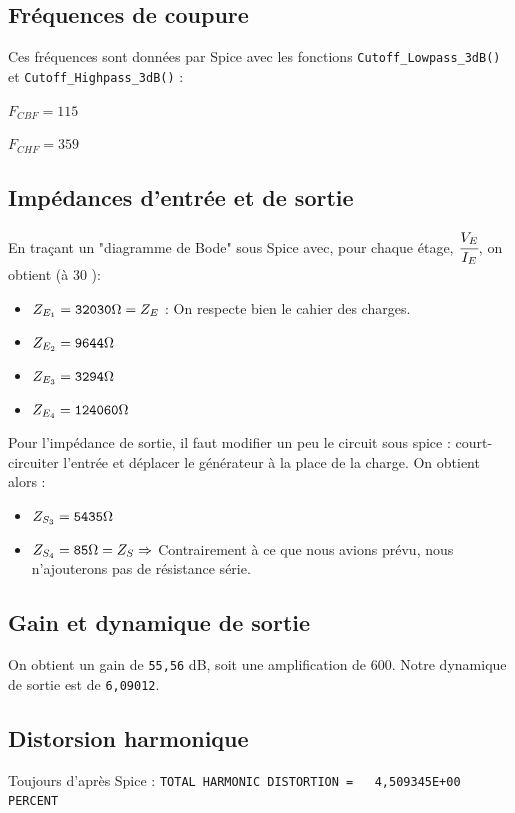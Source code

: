    \subsection{Fréquences de coupure}
    Ces fréquences sont données par Spice avec les fonctions \verb|Cutoff_Lowpass_3dB()| et \verb|Cutoff_Highpass_3dB()| :

    $F_{CBF} = 115$ \hertz

    $F_{CHF} = 359$ \kilo\hertz

   \subsection{Impédances d'entrée et de sortie}
    En traçant un "diagramme de Bode" sous Spice avec, pour chaque étage, $\cfrac{V_E}{I_E}$, on obtient (à 30 \kilo\hertz):
    \begin{itemize}
     \item $Z_{E_1} = \verb|32030|\ohm = Z_E$ : On respecte bien le cahier des charges.
     \item $Z_{E_2} = \verb|9644|\ohm$
     \item $Z_{E_3} = \verb|3294|\ohm$
     \item $Z_{E_4} = \verb|124060|\ohm$
    \end{itemize}

    Pour l'impédance de sortie, il faut modifier un peu le circuit sous spice : court-circuiter l'entrée et déplacer le générateur à la place de la charge. On obtient alors :
    \begin{itemize}
     \item $Z_{S_3} = \verb|5435|\ohm$
     \item $Z_{S_4} = \verb|85|\ohm = Z_S \Rightarrow$ Contrairement à ce que nous avions prévu, nous n'ajouterons pas de résistance série.
    \end{itemize}

   \subsection{Gain et dynamique de sortie}
    On obtient un gain de \verb|55,56| dB, soit une amplification de 600.
    Notre dynamique de sortie est de \verb|6,09012|\volt.
   \subsection{Distorsion harmonique}
    Toujours d'après Spice : \verb|TOTAL HARMONIC DISTORTION =   4,509345E+00 PERCENT|

